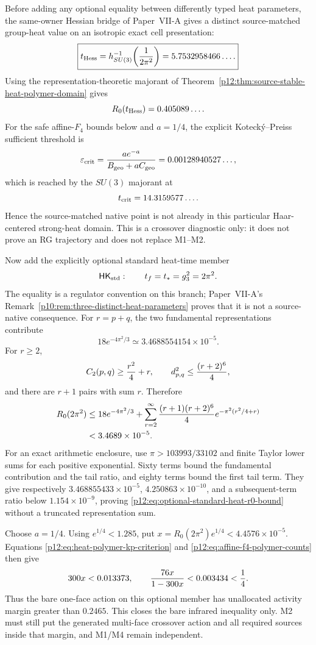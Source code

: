\documentclass[12pt,a4paper]{article}
\begin{document}
Before adding any optional equality between differently typed heat
parameters, the same-owner Hessian bridge of Paper~VII-A gives a distinct
source-matched group-heat value on an isotropic exact cell presentation:
\[
 \boxed{
 t_{\rm Hess}=h_{SU(3)}^{-1}\!\left(\frac1{2\pi^2}\right)
 =5.7532958466\ldots .}
\]
Using the representation-theoretic majorant of
Theorem~\ref{p12:thm:source-stable-heat-polymer-domain} gives
\[
 R_0(t_{\rm Hess})=0.405089\ldots .
\]
For the safe affine-$F_4$ bounds below and $a=1/4$, the explicit
Koteck\'y--Preiss sufficient threshold is
\[
 \varepsilon_{\rm crit}
 =\frac{ae^{-a}}{B_{\rm geo}+aC_{\rm geo}}
 =0.00128940527\ldots,
\]
which is reached by the $SU(3)$ majorant at
\[
 t_{\rm crit}=14.3159577\ldots .
\]
Hence the source-matched native point is not already in this particular
Haar-centered strong-heat domain.  This is a crossover diagnostic only: it
does not prove an RG trajectory and does not replace M1--M2.

Now add the explicitly optional standard heat-time member
\[
 \mathsf{HK}_{\rm std}:\qquad
 t_f=t_*=g_3^2=2\pi^2.
\]
The equality is a regulator convention on this branch; Paper~VII-A's
Remark~\ref{p10:rem:three-distinct-heat-parameters} proves that it is not a
source-native consequence.  For $r=p+q$, the two fundamental representations
contribute
\[
 18e^{-4\pi^2/3}
 \simeq3.4688554154\times10^{-5}.
\]
For $r\ge2$,
\[
 C_2(p,q)\ge {r^2\over4}+r,
 \qquad
 d_{p,q}^2\le{(r+2)^6\over4},
\]
and there are $r+1$ pairs with sum $r$.  Therefore
\begin{equation}
\label{p12:eq:optional-standard-heat-r0-bound}
\begin{aligned}
 R_0(2\pi^2)
 &\le18e^{-4\pi^2/3}
 +\sum_{r=2}^\infty
 { (r+1)(r+2)^6\over4}
 e^{-\pi^2(r^2/4+r)}\\
 &<3.4689\times10^{-5}.
\end{aligned}
\end{equation}
For an exact arithmetic enclosure, use
$\pi>103993/33102$ and finite Taylor lower sums for each positive
exponential.  Sixty terms bound the fundamental contribution and the tail
ratio, and eighty terms bound the first tail term.  They give respectively
$3.468855433\times10^{-5}$, $4.250863\times10^{-10}$, and a subsequent-term
ratio below $1.154\times10^{-9}$, proving
\eqref{p12:eq:optional-standard-heat-r0-bound} without a truncated
representation sum.

Choose $a=1/4$.  Using $e^{1/4}<1.285$, put
$x=R_0(2\pi^2)e^{1/4}<4.4576\times10^{-5}$.  Equations
\eqref{p12:eq:heat-polymer-kp-criterion} and
\eqref{p12:eq:affine-f4-polymer-counts} then give
\[
 300x<0.013373,
 \qquad
 {76x\over1-300x}<0.003434<{1\over4}.
\]
Thus the bare one-face action on this optional member has unallocated
activity margin greater than $0.2465$.  This closes the bare infrared
inequality only.  M2 must still put the generated multi-face crossover action
and all required sources inside that margin, and M1/M4 remain independent.
\end{document}
